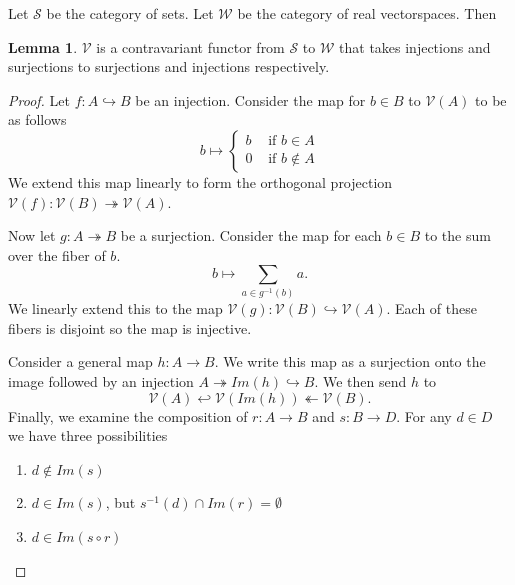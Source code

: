 \documentclass[12pt,a4paper]{article}
\theoremstyle{myrule}
\theoremstyle{postulate}
\theoremstyle{definition}
\newtheorem{lemma}[theorem]{Lemma}
\begin{document}
Let $\mathcal{S}$ be the category of sets.  Let $\mathcal{W}$ be the category of real vectorspaces.  Then
\begin{lemma}
$\mathcal{V}$ is a contravariant functor from $\mathcal{S}$ to $\mathcal{W}$ that takes injections and surjections to surjections and injections respectively.
\end{lemma}
\begin{proof}
  Let $f:A \hookrightarrow B$ be an injection. Consider the map for $b \in B$ to $\mathcal{V}(A)$ to be as follows
  \[
     b \mapsto \left\{ \begin{array}{cc} b & \text{ if } b \in A \\ 0 & \text{ if } b \not \in A  \end{array} \right.
     \]
We extend this map linearly to form the orthogonal projection $\mathcal{V}(f):\mathcal{V}(B) \twoheadrightarrow \mathcal{V}(A)$.

Now let $g:A \twoheadrightarrow B$ be a surjection.  Consider the map for each $b \in B$ to the sum over the fiber of $b$.
  \[
  b \mapsto \sum_{a \in g^{-1}(b)} a.
  \]
We linearly extend this to the map $\mathcal{V}(g):\mathcal{V}(B) \hookrightarrow  \mathcal{V}(A)$.  Each of these fibers is disjoint so the map is injective.

  Consider a general map $h:A \rightarrow B$.  We write this map as a surjection onto the image followed by an injection  $A \twoheadrightarrow Im(h) \hookrightarrow B$.  We then send $h$ to
 \[
 \mathcal{V}(A) \hookleftarrow \mathcal{V}(Im(h)) \twoheadleftarrow \mathcal{V}(B).
 \]
  Finally, we examine the composition of $r:A \rightarrow B$ and $s:B\rightarrow D$.  For any $d \in D$ we have three possibilities
  \begin{enumerate}
  \item $d \not \in Im(s)$
  \item $d \in Im(s)$, but $s^{-1}(d) \cap Im(r) = \emptyset$
  \item $d \in Im(s \circ r)$
  \end{enumerate}


\end{proof}
\end{document}
